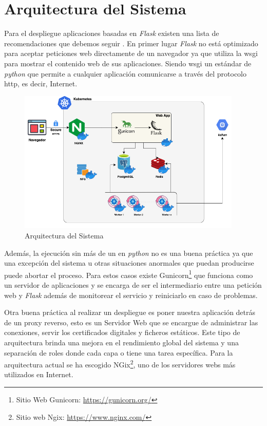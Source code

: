 \documentclass[11pt,spanish,listoffigures,listoftables]{tfgetsinf}
\begin{document}
\section{Arquitectura del Sistema}

Para el despliegue aplicaciones basadas en \textit{Flask} existen una lista de recomendaciones que debemos seguir \cite{link-deploy-flask}. En primer lugar \textit{Flask} no está optimizado para aceptar peticiones web directamente de un navegador ya que utiliza la \acrfull{wsgi} para mostrar el contenido web de sus aplicaciones. Siendo \acrshort{wsgi} un estándar de \textit{python} que permite a cualquier aplicación comunicarse a través del protocolo \acrshort{http}, es decir, Internet. 

\begin{figure}[!ht]
	\centering
	\includegraphics[width=0.95\textwidth]{img/infrastructure-pizarra}
	\caption[Arquitectura del Sistema]{Arquitectura del Sistema}
	\label{figura:infrastructure-pizarra}
\end{figure}

Además, la ejecución sin más de un  en \textit{python} no es una buena práctica ya que una excepción del sistema u otras situaciones anormales que puedan producirse puede abortar el proceso. Para estos casos existe Gunicorn\footnote{Sitio Web Gunicorn: \url{https://gunicorn.org/}} que funciona como un servidor de aplicaciones y se encarga de ser el intermediario entre una petición web y \textit{Flask} además de monitorear el servicio y reiniciarlo en caso de problemas.

Otra buena práctica al realizar un despliegue es poner nuestra aplicación detrás de un proxy reverso, esto es un Servidor Web que se encargue de administrar las conexiones, servir los certificados digitales y ficheros estáticos. Este tipo de arquitectura brinda una mejora en el rendimiento global del sistema y una separación de roles donde cada capa o  tiene una tarea específica. Para la arquitectura actual se ha escogido NGix\footnote{Sitio web Ngix: \url{https://www.nginx.com/}}, uno de los servidores webs más utilizados en Internet.
\end{document}
